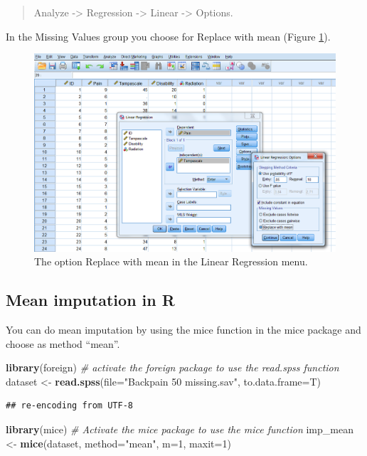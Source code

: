 \documentclass[]{book}
\newenvironment{Shaded}{\begin{snugshade}}{\end{snugshade}}
\newcommand{\KeywordTok}[1]{\textcolor[rgb]{0.13,0.29,0.53}{\textbf{#1}}}
\newcommand{\DataTypeTok}[1]{\textcolor[rgb]{0.13,0.29,0.53}{#1}}
\newcommand{\DecValTok}[1]{\textcolor[rgb]{0.00,0.00,0.81}{#1}}
\newcommand{\StringTok}[1]{\textcolor[rgb]{0.31,0.60,0.02}{#1}}
\newcommand{\CommentTok}[1]{\textcolor[rgb]{0.56,0.35,0.01}{\textit{#1}}}
\newcommand{\NormalTok}[1]{#1}
\begin{document}
\begin{quote}
Analyze -\textgreater{} Regression -\textgreater{} Linear
-\textgreater{} Options.
\end{quote}

In the Missing Values group you choose for Replace with mean (Figure
\ref{fig:fig3-8}).

\begin{figure}

{\centering \includegraphics[width=0.7\linewidth]{images/fig3.8} 

}

\caption{The option Replace with mean in the Linear Regression menu.}\label{fig:fig3-8}
\end{figure}

\subsection{Mean imputation in R}\label{mean-imputation-in-r}

You can do mean imputation by using the mice function in the mice
package and choose as method ``mean''.

\begin{Shaded}
\begin{Highlighting}[]
\KeywordTok{library}\NormalTok{(foreign) }\CommentTok{# activate the foreign package to use the read.spss function}
\NormalTok{dataset <-}\StringTok{ }\KeywordTok{read.spss}\NormalTok{(}\DataTypeTok{file=}\StringTok{"Backpain 50 missing.sav"}\NormalTok{, }\DataTypeTok{to.data.frame=}\NormalTok{T)}
\end{Highlighting}
\end{Shaded}

\begin{verbatim}
## re-encoding from UTF-8
\end{verbatim}

\begin{Shaded}
\begin{Highlighting}[]
\KeywordTok{library}\NormalTok{(mice) }\CommentTok{# Activate the mice package to use the mice function}
\NormalTok{imp_mean <-}\StringTok{ }\KeywordTok{mice}\NormalTok{(dataset, }\DataTypeTok{method=}\StringTok{"mean"}\NormalTok{, }\DataTypeTok{m=}\DecValTok{1}\NormalTok{, }\DataTypeTok{maxit=}\DecValTok{1}\NormalTok{)}
\end{Highlighting}
\end{Shaded}
\end{document}
